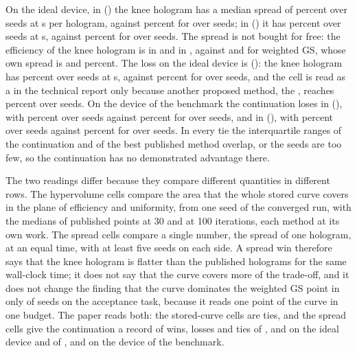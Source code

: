 On the ideal device, in \spreadWinAGeo{} (\spreadWinAName) the knee hologram has a median spread of \spreadWinASigma{} percent over \spreadWinAN{} seeds at \spreadWinASec{} s per hologram, against \spreadWinAPubSigma{} percent for \spreadWinAPubName{} over \spreadWinAPubN{} seeds; in \spreadWinBGeo{} (\spreadWinBName) it has \spreadWinBSigma{} percent over \spreadWinBN{} seeds at \spreadWinBSec{} s, against \spreadWinBPubSigma{} percent for \spreadWinBPubName{} over \spreadWinBPubN{} seeds. The spread is not bought for free: the efficiency of the knee hologram is \spreadWinAEff{} in \spreadWinAGeo{} and \spreadWinBEff{} in \spreadWinBGeo{}, against \spreadWinAWgsEff{} and \spreadWinBWgsEff{} for weighted GS, whose own spread is \spreadWinAWgsSigma{} and \spreadWinBWgsSigma{} percent. The loss on the ideal device is \spreadLossAGeo{} (\spreadLossAName): the knee hologram has \spreadLossASigma{} percent over \spreadLossAN{} seeds at \spreadLossASec{} s, against \spreadLossAPubSigma{} percent for \spreadLossAPubName{} over \spreadLossAPubN{} seeds, and the cell is read as a \spreadLossACellRead{} in the technical report only because another proposed method, the \spreadLossACellBy{}, reaches \spreadLossACellBySigma{} percent over \spreadLossACellByN{} seeds. On the device of the benchmark the continuation loses in \spreadDevLossAGeo{} (\spreadDevLossAName), with \spreadDevLossASigma{} percent over \spreadDevLossAN{} seeds against \spreadDevLossAPubSigma{} percent for \spreadDevLossAPubName{} over \spreadDevLossAPubN{} seeds, and in \spreadDevLossBGeo{} (\spreadDevLossBName), with \spreadDevLossBSigma{} percent over \spreadDevLossBN{} seeds against \spreadDevLossBPubSigma{} percent for \spreadDevLossBPubName{} over \spreadDevLossBPubN{} seeds. In every tie the interquartile ranges of the continuation and of the best published method overlap, or the seeds are too few, so the continuation has no demonstrated advantage there.

The two readings differ because they compare different quantities in different rows. The hypervolume cells compare the area that the whole stored curve covers in the plane of efficiency and uniformity, from one seed of the converged run, with the medians of published points at 30 and at 100 iterations, each method at its own work. The spread cells compare a single number, the spread of one hologram, at an equal time, with at least five seeds on each side. A spread win therefore says that the knee hologram is flatter than the published holograms for the same wall-clock time; it does not say that the curve covers more of the trade-off, and it does not change the finding that the curve dominates the weighted GS point in only \domGSWSeeds{} of \nSeeds{} seeds on the acceptance task, because it reads one point of the curve in one budget. The paper reads both: the stored-curve cells are ties, and the spread cells give the continuation a record of wins, losses and ties of \spreadWins{}, \spreadLosses{} and \spreadTies{} on the ideal device and of \spreadDevWins{}, \spreadDevLosses{} and \spreadDevTies{} on the device of the benchmark.

